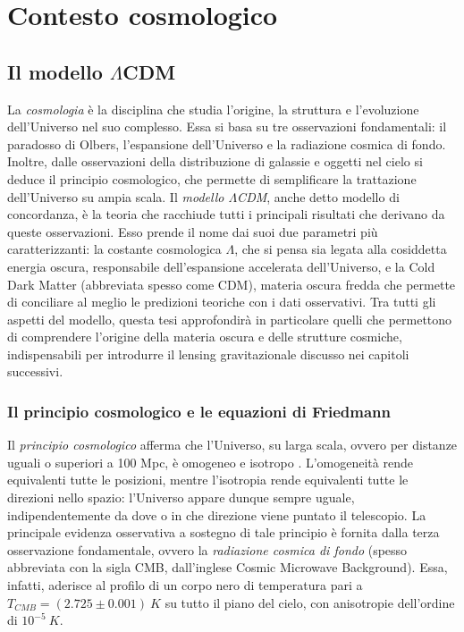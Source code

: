 \chapter{Contesto cosmologico}
\label{cap:cosmologia}

\section{Il modello \texorpdfstring{$\Lambda$CDM}{LambdaCDM}}
\label{sez:LCDM}
La \emph{cosmologia} è la disciplina che studia l'origine, la struttura e l'evoluzione dell'Universo nel suo complesso. Essa si basa su tre osservazioni fondamentali: il paradosso di Olbers, l'espansione dell'Universo e la radiazione cosmica di fondo. Inoltre, dalle osservazioni della distribuzione di galassie e oggetti nel cielo si deduce il principio cosmologico, che permette di semplificare la trattazione dell'Universo su ampia scala.
Il \emph{modello $\Lambda$CDM}, anche detto modello di concordanza, è la teoria che racchiude tutti i principali risultati che derivano da queste osservazioni. Esso prende il nome dai suoi due parametri più caratterizzanti: la costante cosmologica $\Lambda$, che si pensa sia legata alla cosiddetta energia oscura, responsabile dell'espansione accelerata dell'Universo, e la Cold Dark Matter (abbreviata spesso come CDM), materia oscura fredda che permette di conciliare al meglio le predizioni teoriche con i dati osservativi. 
Tra tutti gli aspetti del modello, questa tesi approfondirà  in particolare quelli che permettono di comprendere l'origine della materia oscura e delle strutture cosmiche, indispensabili per introdurre il lensing gravitazionale discusso nei capitoli successivi. 

\subsection{Il principio cosmologico e le equazioni di Friedmann}
Il \emph{principio cosmologico} afferma che l'Universo, su larga scala, ovvero per distanze uguali o superiori a 100 Mpc, è omogeneo e isotropo \parencite{Ryden2003}.
L'omogeneità rende equivalenti tutte le posizioni, mentre l'isotropia rende equivalenti tutte le direzioni nello spazio: l'Universo appare dunque sempre uguale, indipendentemente da dove o in che direzione viene puntato il telescopio.
La principale evidenza osservativa a sostegno di tale principio è fornita dalla 
terza osservazione fondamentale, ovvero la \emph{radiazione cosmica di fondo} (spesso abbreviata con la sigla CMB, dall'inglese Cosmic Microwave Background). Essa, infatti, aderisce al profilo di un corpo nero di temperatura pari a $T_{CMB}=(2.725 \pm 0.001)\ K$ su tutto il piano del cielo, con anisotropie dell'ordine di $10^{-5}\ K$.


